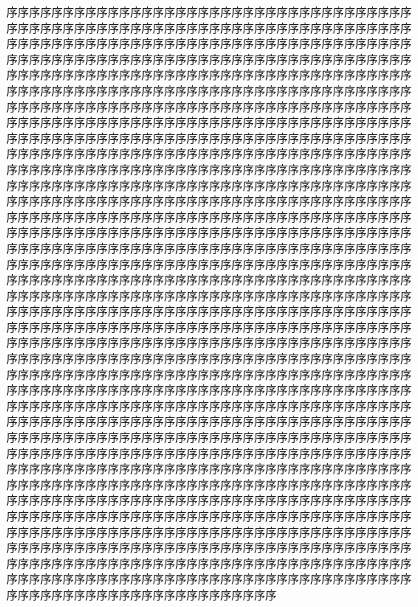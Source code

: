 序序序序序序序序序序序序序序序序序序序序序序序序序序序序序序序序序序序序序序序序序序序序序序序序序序序序序序序序序序序序序序序序序序序序序序序序序序序序序序序序序序序序序序序序序序序序序序序序序序序序序序序序序序序序序序序序序序序序序序序序序序序序序序序序序序序序序序序序序序序序序序序序序序序序序序序序序序序序序序序序序序序序序序序序序序序序序序序序序序序序序序序序序序序序序序序序序序序序序序序序序序序序序序序序序序序序序序序序序序序序序序序序序序序序序序序序序序序序序序序序序序序序序序序序序序序序序序序序序序序序序序序序序序序序序序序序序序序序序序序序序序序序序序序序序序序序序序序序序序序序序序序序序序序序序序序序序序序序序序序序序序序序序序序序序序序序序序序序序序序序序序序序序序序序序序序序序序序序序序序序序序序序序序序序序序序序序序序序序序序序序序序序序序序序序序序序序序序序序序序序序序序序序序序序序序序序序序序序序序序序序序序序序序序序序序序序序序序序序序序序序序序序序序序序序序序序序序序序序序序序序序序序序序序序序序序序序序序序序序序序序序序序序序序序序序序序序序序序序序序序序序序序序序序序序序序序序序序序序序序序序序序序序序序序序序序序序序序序序序序序序序序序序序序序序序序序序序序序序序序序序序序序序序序序序序序序序序序序序序序序序序序序序序序序序序序序序序序序序序序序序序序序序序序序序序序序序序序序序序序序序序序序序序序序序序序序序序序序序序序序序序序序序序序序序序序序序序序序序序序序序序序序序序序序序序序序序序序序序序序序序序序序序序序序序序序序序序序序序序序序序序序序序序序序序序序序序序序序序序序序序序序序序序序序序序序序序序序序序序序序序序序序序序序序序序序序序序序序序序序序序序序序序序序序序序序序序序序序序序序序序序序序序序序序序序序序序序序序序序序序序序序序序序序序序序序序序序序序序序序序序序序序序序序序序序序序序序序序序序序序序序序序序序序序序序序序序序序序序序序序序序序序序序序序序序序序序序序序序序序序序序序序序序序序序序序序序序序序序序序序序序序序序序序序序序序序序序序序序序序序序序序序序序序序序序序序序序序序序序序序序序序序序序序序序序序序序序序序序序序序序序序序序序序序序序序序序序序序序序序序序序序序序序序序序序序序序序序序序序序序序序序序序序序序序序序序序序序序序序序序序序序序序序序序序序序序序序序序序序序序序序序序序序序序序序序序序序序序序序序序序序序序序序序序序序序序序序序序序序序序序序序序序序序序序序序序序序序序序序序序序序序序序序序序序序序序序序序序序序序序序序序序序序序序序序序序序序序序序序序序序序序序序序序序序序序序序序序序序序序序序序序序序序序序序序序序序序序序序序序序序序序序序序序序序序序序序序序序序序序序序序序序序序序序序序序序序序序序序序序序序序序序序序序序序序序序序序序序序序序序序序序序序序序序序序序序序序序序序序序序序序序序序序序序序序序序序序序序序序序序序序序序序序序序序序序序序序序序序序序序序序序序序序序序序序序序序序序序序序序序序序序序序序序序序序序序序序序序序序序序序序序序序序序序序序序序序序序序